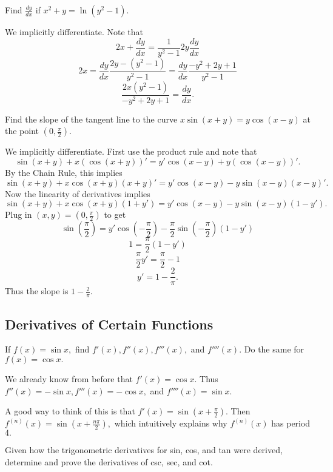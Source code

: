 \documentclass{article}
\begin{document}
\begin{exer}
Find $\frac{dy}{dx}$ if $x^2+y=\ln(y^2-1).$
\end{exer}

\begin{sol}
We implicitly differentiate. Note that
\[2x+\frac{dy}{dx}=\frac{1}{y^2-1}2y\frac{dy}{dx}\]
\[2x=\frac{dy}{dx}\frac{2y-(y^2-1)}{y^2-1}=\frac{dy}{dx}\frac{-y^2+2y+1}{y^2-1}\]
\[\frac{2x(y^2-1)}{-y^2+2y+1}=\frac{dy}{dx}.\]
\end{sol}

\begin{exer}
Find the slope of the tangent line to the curve $x\sin (x+y)=y\cos (x-y)$ at the point $(0,\frac{\pi}{2}).$
\end{exer}

\begin{sol}
We implicitly differentiate. First use the product rule and note that
\[\sin(x+y)+x(\cos(x+y))'=y'\cos(x-y)+y(\cos(x-y))'.\]
By the Chain Rule, this implies
\[\sin(x+y)+x\cos(x+y)(x+y)'=y'\cos(x-y)-y\sin(x-y)(x-y)'.\]
Now the linearity of derivatives implies
\[\sin(x+y)+x\cos(x+y)(1+y')=y'\cos(x-y)-y\sin(x-y)(1-y').\]
Plug in $(x,y)=(0,\frac{\pi}{2})$ to get
\[\sin(\frac{\pi}{2})=y'\cos(-\frac{\pi}{2})-\frac{\pi}{2}\sin(-\frac{\pi}{2})(1-y')\]
\[1=\frac{\pi}{2}(1-y')\]
\[\frac{\pi}{2}y'=\frac{\pi}{2}-1\]
\[y'=1-\frac{2}{\pi}.\]
Thus the slope is $1-\frac{2}{\pi}.$
\end{sol}

\subsection{Derivatives of Certain Functions}

\begin{exer}
If $f(x)=\sin x,$ find $f'(x),f''(x),f'''(x),$ and $f''''(x).$ Do the same for $f(x)=\cos x.$
\end{exer}

\begin{sol}
We already know from before that $f'(x)=\cos x.$ Thus $f''(x)=-\sin x,f'''(x)=-\cos x,$ and $f''''(x)=\sin x.$

A good way to think of this is that $f'(x)=\sin(x+\frac{\pi}{2}).$ Then $f^{(n)}(x)=\sin(x+\frac{n\pi}{2}),$ which intuitively explains why $f^{(n)}(x)$ has period $4.$
\end{sol}

\begin{exer}
Given how the trigonometric derivatives for sin, cos, and tan were derived, determine and prove the derivatives of csc, sec, and cot.
\end{exer}
\end{document}
